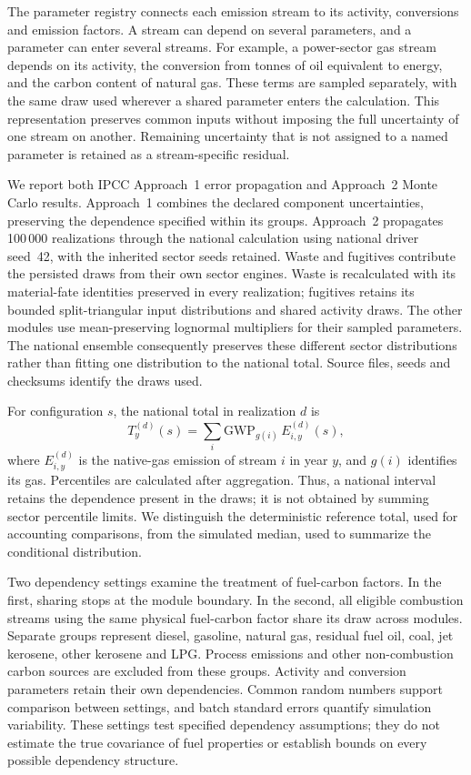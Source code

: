 \documentclass[essd]{copernicus}
\begin{document}
The parameter registry connects each emission stream to its activity, conversions and emission factors. A stream can depend on several parameters, and a parameter can enter several streams. For example, a power-sector gas stream depends on its activity, the conversion from tonnes of oil equivalent to energy, and the carbon content of natural gas. These terms are sampled separately, with the same draw used wherever a shared parameter enters the calculation. This representation preserves common inputs without imposing the full uncertainty of one stream on another. Remaining uncertainty that is not assigned to a named parameter is retained as a stream-specific residual.

We report both IPCC Approach~1 error propagation and Approach~2 Monte Carlo results. Approach~1 combines the declared component uncertainties, preserving the dependence specified within its groups. Approach~2 propagates 100\,000 realizations through the national calculation using national driver seed~42, with the inherited sector seeds retained. Waste and fugitives contribute the persisted draws from their own sector engines. Waste is recalculated with its material-fate identities preserved in every realization; fugitives retains its bounded split-triangular input distributions and shared activity draws. The other modules use mean-preserving lognormal multipliers for their sampled parameters. The national ensemble consequently preserves these different sector distributions rather than fitting one distribution to the national total. Source files, seeds and checksums identify the draws used.

For configuration $s$, the national total in realization $d$ is
\begin{equation}
 T_y^{(d)}(s)=\sum_i \mathrm{GWP}_{g(i)}\,
 E_{i,y}^{(d)}(s),
 \label{eq:uncertainty_total}
\end{equation}
where $E_{i,y}^{(d)}$ is the native-gas emission of stream $i$ in year $y$, and $g(i)$ identifies its gas. Percentiles are calculated after aggregation. Thus, a national interval retains the dependence present in the draws; it is not obtained by summing sector percentile limits. We distinguish the deterministic reference total, used for accounting comparisons, from the simulated median, used to summarize the conditional distribution.

Two dependency settings examine the treatment of fuel-carbon factors. In the first, sharing stops at the module boundary. In the second, all eligible combustion streams using the same physical fuel-carbon factor share its draw across modules. Separate groups represent diesel, gasoline, natural gas, residual fuel oil, coal, jet kerosene, other kerosene and LPG. Process emissions and other non-combustion carbon sources are excluded from these groups. Activity and conversion parameters retain their own dependencies. Common random numbers support comparison between settings, and batch standard errors quantify simulation variability. These settings test specified dependency assumptions; they do not estimate the true covariance of fuel properties or establish bounds on every possible dependency structure.
\end{document}
